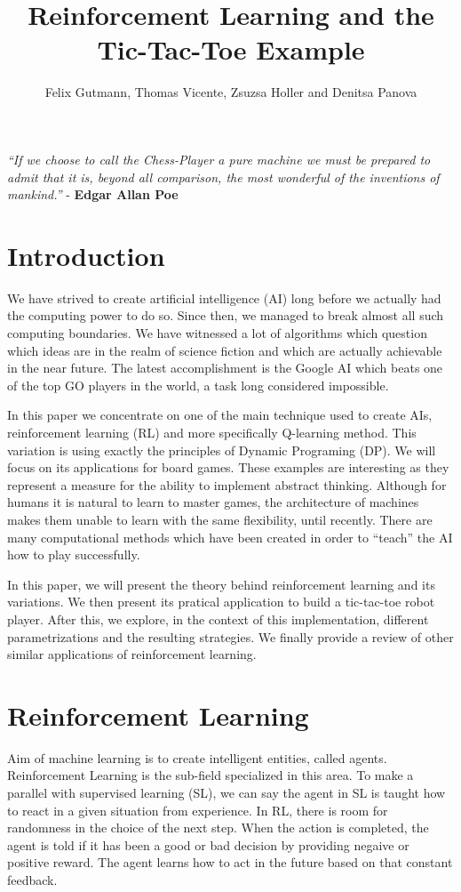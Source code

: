 \documentclass[fleqn]{article}
\title{Reinforcement Learning and the Tic-Tac-Toe Example}
\author{Felix Gutmann, Thomas Vicente, Zsuzsa Holler and Denitsa Panova}
\date{}
\begin{document}
\maketitle
\textit{“If we choose to call the Chess-Player a pure machine we must be prepared to 
admit that it is, beyond all comparison, the most wonderful of the inventions of mankind.”}
- \textbf{Edgar Allan Poe}

\section{Introduction}

We have strived to create artificial intelligence (AI) long before we actually had the computing power to do so. Since then, we managed to break almost all such computing boundaries. We have witnessed a lot of algorithms which question which ideas are in the realm of science fiction and which are actually achievable in the near future. The latest accomplishment is the Google AI which beats one of the top GO players in the world, a task long considered impossible. 

In this paper we concentrate on one of the main technique used to create AIs, reinforcement learning (RL) and more specifically Q-learning method. This variation is using exactly the principles of Dynamic Programing (DP). We will focus on its applications for board games. These examples are interesting as they represent a measure for the ability to implement abstract thinking. Although for humans it is natural to learn to master games, the architecture of machines makes them unable to learn with the same flexibility, until recently. There are many computational methods which have been created in order to “teach” the AI how to play successfully. 


In this paper, we will present the theory behind reinforcement learning and its variations. We then present its pratical application to build a tic-tac-toe robot player. After this, we explore, in the context of this implementation, different parametrizations and the resulting strategies. We finally provide a review of other similar applications of reinforcement learning.

\section{Reinforcement Learning}

Aim of machine learning is to create intelligent entities, called agents. Reinforcement Learning is the sub-field specialized in this area. To make a parallel with supervised learning (SL), we can say the agent in SL is taught how to react in a given situation from experience. In RL, there is room for randomness in the choice of the next step. When the action is completed, the agent is told if it has been a good or bad decision by providing negaive or positive reward. The agent learns how to act in the future based on that constant feedback. 
\end{document}
